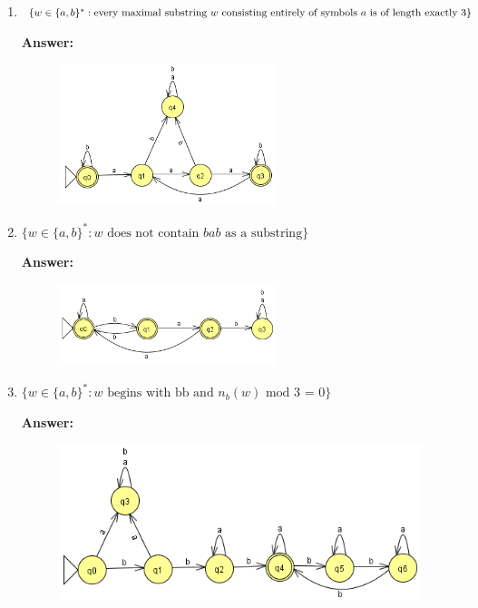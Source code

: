 \documentclass[12pt]{article}
\begin{document}
\begin{spacing}{1.5}
\begin{enumerate}
\begin{enumerate}
			      \item $\{w \in \{a,b \}^* : \text{every maximal substring } w \text{ consisting entirely of symbols } a \\ \text{ is of length exactly 3} \}$

			            \noindent \textbf{Answer:}

			            \begin{figure}[h!]
				            \centering
				            \includegraphics[width=0.6\textwidth]{img/q3/q3_b.png}
			            \end{figure}

			            \newpage

			      \item $\{w \in \{a,b \}^* : \text{$w$ does not contain $bab$ as a substring} \}$

			            \noindent \textbf{Answer:}

			            \begin{figure}[h!]
				            \centering
				            \includegraphics[width=0.6\textwidth]{img/q3/q3_c.png}
			            \end{figure}

			      \item $\{w \in \{a,b \}^* : \text{$w$ begins with bb and $n_b(w)$ mod 3 = 0} \}$

			            \noindent \textbf{Answer:}

			            \begin{figure}[h!]
				            \centering
				            \includegraphics[width=0.75	\textwidth]{img/q3/q3_d.png}
			            \end{figure}


\end{enumerate}
\end{enumerate}
\end{spacing}
\end{document}
